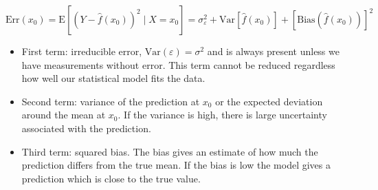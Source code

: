 \documentclass[
  ignorenonframetext,
]{beamer}
\providecommand{\tightlist}{%
  \setlength{\itemsep}{0pt}\setlength{\parskip}{0pt}}
\begin{document}
\begin{frame}

\[ \text{Err}(x_0)=\text{E}[(Y-\hat{f}(x_0))^2 \mid X=x_0]=\sigma_{\varepsilon}^2 +  \text{Var}[\hat{f}(x_0)]+[\text{Bias}(\hat{f}(x_0))]^2\]

\begin{itemize}
\tightlist
\item
  First term: irreducible error, \(\text{Var}(\varepsilon)=\sigma^2\)
  and is always present unless we have measurements without error. This
  term cannot be reduced regardless how well our statistical model fits
  the data.
\item
  Second term: variance of the prediction at \(x_0\) or the expected
  deviation around the mean at \(x_0\). If the variance is high, there
  is large uncertainty associated with the prediction.
\item
  Third term: squared bias. The bias gives an estimate of how much the
  prediction differs from the true mean. If the bias is low the model
  gives a prediction which is close to the true value.
\end{itemize}

\end{frame}
\end{document}
